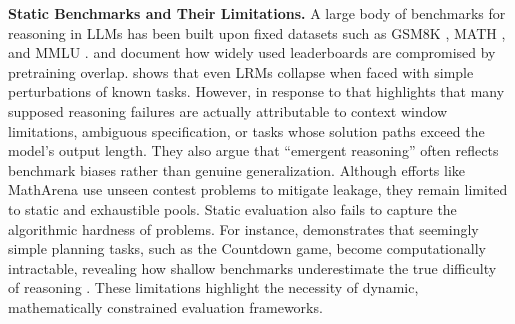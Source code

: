 \documentclass{article} %
\theoremstyle{plain}
\theoremstyle{definition}
\begin{document}
\textbf{Static Benchmarks and Their Limitations.} A large body of benchmarks for reasoning in LLMs has been built upon fixed datasets such as GSM8K \citep{cobbe2021training}, MATH \citep{hendrycks2021measuring}, and MMLU \citep{hendrycks2021measuring}. \citep{xu2024survey} and \citep{cheng2025contam} document how widely used leaderboards are compromised by pretraining overlap. \citep{shojaee2025illusion} shows that even LRMs collapse when faced with simple perturbations of known tasks. However, in response to that \citep{opus2025illusion} highlights that many supposed reasoning failures are actually attributable to context window limitations, ambiguous specification, or tasks whose solution paths exceed the model’s output length. They also argue that “emergent reasoning” often reflects benchmark biases rather than genuine generalization. Although efforts like MathArena \citep{balunovic2025matharena} use unseen contest problems to mitigate leakage, they remain limited to static and exhaustible pools. Static evaluation also fails to capture the algorithmic hardness of problems. For instance, \citep{katz2025seemingly} demonstrates that seemingly simple planning tasks, such as the Countdown game, become computationally intractable, revealing how shallow benchmarks underestimate the true difficulty of reasoning \citep{wu-etal-2024-reasoning, yu2025benchmarkingreasoningrobustnesslarge}. These limitations highlight the necessity of dynamic, mathematically constrained evaluation frameworks.  
\end{document}
